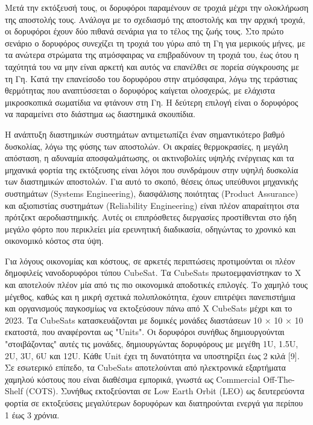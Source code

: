\documentclass[a4paper,nobib,justified]{tufte-book}
\begin{document}
Μετά την εκτόξευσή τους, οι δορυφόροι παραμένουν σε τροχιά μέχρι την ολοκλήρωση της αποστολής τους. Ανάλογα με το σχεδιασμό της αποστολής και την αρχική τροχιά, οι δορυφόροι έχουν δύο πιθανά σενάρια για το τέλος της ζωής τους. Στο πρώτο σενάριο ο δορυφόρος συνεχίζει τη τροχιά του γύρω από τη Γη για μερικούς μήνες, με τα ανώτερα στρώματα της ατμόσφαιρας να επιβραδύνουν τη τροχιά του, έως ότου η ταχύτητά του να μην είναι αρκετή και αυτός να επανέλθει σε πορεία σύγκρουσης με τη Γη. Κατά την επανείσοδο του δορυφόρου στην ατμόσφαιρα, λόγω της τεράστιας θερμότητας που αναπτύσσεται ο δορυφόρος καίγεται ολοσχερώς, με ελάχιστα μικροσκοπικά σωματίδια να φτάνουν στη Γη. Η δεύτερη επιλογή είναι ο δορυφόρος να παραμείνει στο διάστημα ως διαστημικά σκουπίδια. %

Η ανάπτυξη διαστημικών συστημάτων αντιμετωπίζει έναν σημαντικότερο βαθμό δυσκολίας, λόγω της φύσης των αποστολών. Οι ακραίες θερμοκρασίες, η μεγάλη απόσταση, η αδυναμία αποσφαλμάτωσης, οι ακτινοβολίες υψηλής ενέργειας και τα μηχανικά φορτία της εκτόξευσης είναι λόγοι που συνδράμουν στην υψηλή δυσκολία των διαστημικών αποστολών. Για αυτό το σκοπό, θέσεις όπως υπεύθυνοι μηχανικής συστημάτων (Systems Engineering), διασφάλισης ποιότητας (Product Assurance) και αξιοπιστίας συστημάτων (Reliability Engineering) είναι πλέον απαραίτητοι στα πρότζεκτ αεροδιαστημικής. Αυτές οι επιπρόσθετες διεργασίες προστίθενται στο ήδη μεγάλο φόρτο που περικλείει μία ερευνητική διαδικασία, οδηγώντας το χρονικό και οικονομικό κόστος στα ύψη.

Για λόγους οικονομίας και κόστους, σε αρκετές περιπτώσεις προτιμούνται οι πλέον δημοφιλείς νανοδορυφόροι τύπου CubeSat. Τα CubeSats πρωτοεμφανίστηκαν το Χ και αποτελούν πλέον μία από τις πιο οικονομικά αποδοτικές επιλογές. Το χαμηλό τους μέγεθος, καθώς και η μικρή σχετικά πολυπλοκότητα, έχουν επιτρέψει πανεπιστήμια και οργανισμούς παγκοσμίως να εκτοξεύσουν πάνω από X CubeSats μέχρι και το 2023. %
Τα CubeSats κατασκευάζονται με δομικές μονάδες διαστάσεων 10 × 10 × 10 εκατοστά, που αναφέρονται ως "Units". Οι δορυφόροι συνήθως δημιουργούνται "στοιβάζοντας" αυτές τις μονάδες, δημιουργώντας δορυφόρους με μεγέθη 1U, 1.5U, 2U, 3U, 6U και 12U. Κάθε Unit έχει τη δυνατότητα να υποστηρίξει έως 2 κιλά [9]. Σε εσωτερικό επίπεδο, τα CubeSats αποτελούνται από ηλεκτρονικά εξαρτήματα χαμηλού κόστους που είναι διαθέσιμα εμπορικά, γνωστά ως Commercial Off-The-Shelf (COTS). Συνήθως εκτοξεύονται σε Low Earth Orbit (LEO) ως δευτερεύοντα φορτία σε εκτοξεύσεις μεγαλύτερων δορυφόρων και διατηρούνται ενεργά για περίπου 1 έως 3 χρόνια.
\end{document}
